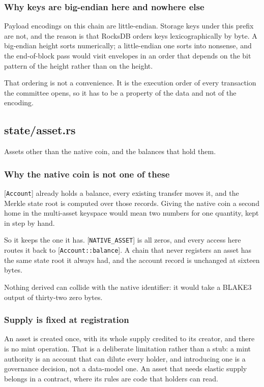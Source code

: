 \documentclass[11pt,a4paper]{article}
\begin{document}
\subsubsection{Why keys are big-endian here and nowhere else}

Payload encodings on this chain are little-endian. Storage keys under this
prefix are not, and the reason is that RocksDB orders keys lexicographically
by byte. A big-endian height sorts numerically; a little-endian one sorts
into nonsense, and the end-of-block pass would visit envelopes in an order
that depends on the bit pattern of the height rather than on the height.

That ordering is not a convenience. It is the execution order of every
transaction the committee opens, so it has to be a property of the data and
not of the encoding.

\subsection{state/asset.rs}
Assets other than the native coin, and the balances that hold them.

\subsubsection{Why the native coin is not one of these}

[\texttt{Account}] already holds a balance, every existing transfer moves it, and
the Merkle state root is computed over those records. Giving the native coin
a second home in the multi-asset keyspace would mean two numbers for one
quantity, kept in step by hand.

So it keeps the one it has. [\texttt{NATIVE\_ASSET}] is all zeros, and every access
here routes it back to [\texttt{Account::balance}]. A chain that never registers an
asset has the same state root it always had, and the account record is
unchanged at sixteen bytes.

Nothing derived can collide with the native identifier: it would take a
BLAKE3 output of thirty-two zero bytes.

\subsubsection{Supply is fixed at registration}

An asset is created once, with its whole supply credited to its creator, and
there is no mint operation. That is a deliberate limitation rather than a
stub: a mint authority is an account that can dilute every holder, and
introducing one is a governance decision, not a data-model one. An asset
that needs elastic supply belongs in a contract, where its rules are code
that holders can read.
\end{document}
